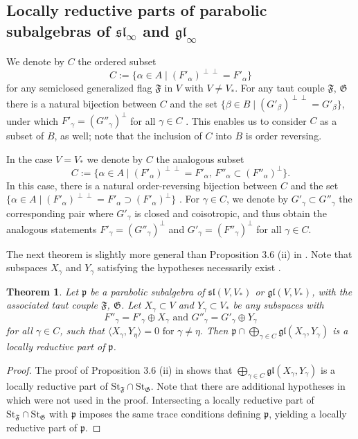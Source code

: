 \documentclass{amsart}
\newtheorem{theorem}{Theorem}[section]
\theoremstyle{definition}
\theoremstyle{remark}
\numberwithin{equation}{section}
\newcommand {\St} {\mathrm{St}}
\def\gl{\mathfrak {gl}}
\def\p{\mathfrak {p}}
\def\sl{\mathfrak{sl}}
\def\F{\mathfrak{F}}
\def\G{\mathfrak{G}}
\begin{document}
\subsection{Locally reductive parts of parabolic subalgebras of $\sl_\infty$ and $\gl_\infty$}


We denote by $C$ the ordered subset  $$C:= \{ \alpha \in A \mid (F'_\alpha)^{\perp \perp} = F'_\alpha \}$$ for any semiclosed generalized flag $\F$ in $V$ with $V \neq V_*$.  For any taut couple $\F$, $\G$ there is a natural bijection between $C$ and the set $\{ \beta \in B \mid (G'_\beta)^{\perp \perp} = G'_\beta \}$, under which $F'_\gamma = (G''_\gamma)^\perp$ for all $\gamma \in C$ \cite[Proposition 3.4]{DP}.  This enables us to consider $C$ as a subset of $B$, as well; note that the inclusion of $C$ into $B$ is order reversing.

In the case $V = V_*$ we denote by $C$ the analogous subset $$C := \{ \alpha \in A \mid (F'_\alpha)^{\perp \perp} = F'_\alpha \textrm{, } F''_\alpha \subset (F''_\alpha)^\perp \}.$$  In this case, there is a natural order-reversing bijection between $C$ and the set $\{ \alpha \in A \mid (F'_\alpha)^{\perp \perp} = F'_\alpha \supset (F'_\alpha)^\perp \}$ \cite[Proposition 6.1]{DP}.  For $\gamma \in C$, we denote by $G'_\gamma \subset G''_\gamma$ the corresponding pair where $G'_\gamma$ is closed and coisotropic, and thus obtain the analogous statements $F'_\gamma = (G''_\gamma)^\perp$ and $G'_\gamma = (F''_\gamma)^\perp$ for all $\gamma \in C$.


The next theorem is slightly more general than Proposition 3.6 (ii) in \cite{DP}.  Note that subspaces $X_\gamma$ and $Y_\gamma$ satisfying the hypotheses necessarily exist \cite[Prop. 3.6 (ii)]{DP}.


\begin{theorem} \label{strongerhypotheses}
Let $\p$ be a parabolic subalgebra of $\sl(V,V_*)$ or $\gl(V,V_*)$, with the associated taut couple $\F$, $\G$. 
Let $X_\gamma \subset V$ and $Y_\gamma \subset V_*$ be any subspaces with $$F''_\gamma = F'_\gamma \oplus X_\gamma \textrm{ and } G''_\gamma = G'_\gamma \oplus Y_\gamma$$ for all $\gamma \in C$, such that
$\langle X_\gamma , Y_\eta \rangle = 0 \textrm{ for } \gamma \neq \eta.$
Then $\p \cap \bigoplus_{\gamma \in C} \gl(X_\gamma, Y_\gamma)$ is a locally reductive part of $\p$.
\end{theorem}

\begin{proof}
The proof of Proposition 3.6 (ii) in \cite{DP} shows that $\bigoplus_{\gamma \in C} \gl(X_\gamma, Y_\gamma)$ is a locally reductive part of $\St_\F \cap \St_\G$.  Note that there are additional hypotheses in \cite{DP} which were not used in the proof.  Intersecting a locally reductive part of $\St_\F \cap \St_\G$ with $\p$ imposes the same trace conditions defining $\p$, yielding a locally reductive part of $\p$.
\end{proof}
\end{document}
